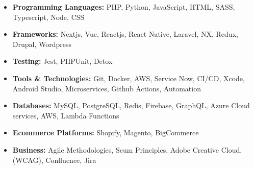 \begin{itemize}
    \item \textbf{Programming Languages:} PHP, Python, JavaScript, HTML, SASS, Typescript, Node, CSS
    \item \textbf{Frameworks:} Nextjs, Vue, Reactjs, React Native, Laravel, NX, Redux, Drupal, Wordpress
    \item \textbf{Testing:} Jest, PHPUnit, Detox
    \item \textbf{Tools \& Technologies:} Git, Docker, AWS, Service Now, CI/CD, Xcode, Android Studio, Microservices, Github Actions, Automation
    \item \textbf{Databases:} MySQL, PostgreSQL, Redis, Firebase, GraphQL, Azure Cloud services, AWS, Lambda Functions
    \item \textbf{Ecommerce Platforms:} Shopify, Magento, BigCommerce
    \item \textbf{Business:} Agile Methodologies, Scum Principles, Adobe Creative Cloud, (WCAG), Confluence, Jira
\end{itemize}
